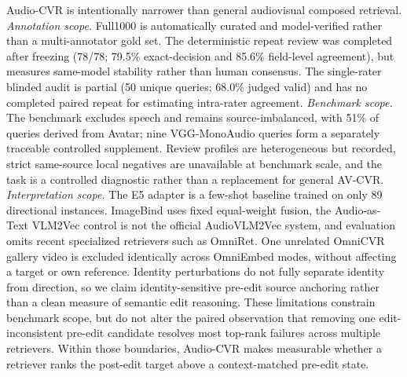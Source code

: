 \documentclass[letterpaper]{article}
\begin{document}
Audio-CVR is intentionally narrower than general audiovisual composed retrieval.
\textit{Annotation scope.} Full1000 is automatically curated and model-verified rather than a multi-annotator gold set. The deterministic repeat review was completed after freezing (78/78; 79.5\% exact-decision and 85.6\% field-level agreement), but measures same-model stability rather than human consensus. The single-rater blinded audit is partial (50 unique queries; 68.0\% judged valid) and has no completed paired repeat for estimating intra-rater agreement. \textit{Benchmark scope.} The benchmark excludes speech and remains source-imbalanced, with 51\% of queries derived from Avatar; nine VGG-MonoAudio queries form a separately traceable controlled supplement. Review profiles are heterogeneous but recorded, strict same-source local negatives are unavailable at benchmark scale, and the task is a controlled diagnostic rather than a replacement for general AV-CVR. \textit{Interpretation scope.} The E5 adapter is a few-shot baseline trained on only 89 directional instances. ImageBind uses fixed equal-weight fusion, the Audio-as-Text VLM2Vec control is not the official AudioVLM2Vec system, and evaluation omits recent specialized retrievers such as OmniRet. One unrelated OmniCVR gallery video is excluded identically across OmniEmbed modes, without affecting a target or own reference. Identity perturbations do not fully separate identity from direction, so we claim identity-sensitive pre-edit source anchoring rather than a clean measure of semantic edit reasoning.
These limitations constrain benchmark scope, but do not alter the paired observation that removing one edit-inconsistent pre-edit candidate resolves most top-rank failures across multiple retrievers.
Within those boundaries, Audio-CVR makes measurable whether a retriever ranks the post-edit target above a context-matched pre-edit state.


\end{document}
